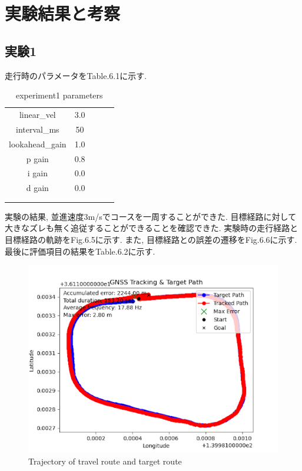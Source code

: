 \section{実験結果と考察}

\subsection{実験1}
走行時のパラメータをTable.6.1に示す.
\begin{table}[H]
     \centering
     \caption{experiment1 parameters}
     \begin{tabular}{cclll}
     \multicolumn{1}{c|}{linear\_vel}     & 3.0  &  &  &  \\
     \multicolumn{1}{c|}{interval\_ms}    & 50   &  &  &  \\
     \multicolumn{1}{c|}{lookahead\_gain} & 1.0  &  &  &  \\
     \multicolumn{1}{c|}{p gain}          & 0.8  &  &  &  \\
     \multicolumn{1}{c|}{i gain}          & 0.0  &  &  &  \\
     \multicolumn{1}{c|}{d gain}          & 0.0 &  &  &  \\
     \multicolumn{1}{l}{}                 &      &  &  &  \\
     \multicolumn{1}{l}{}                 &      &  &  & 
     \end{tabular}
\end{table}

実験の結果, 並進速度3m/sでコースを一周することができた.
目標経路に対して大きなズレも無く追従することができることを確認できた.
実験時の走行経路と目標経路の軌跡をFig.6.5に示す.
また, 目標経路との誤差の遷移をFig.6.6に示す.
最後に評価項目の結果をTable.6.2に示す.

\begin{figure}[H]
     \centering
    \includegraphics[keepaspectratio, scale=0.7]
         {images/3mspath.png}
    \caption{Trajectory of travel route and target route}
    \label{fig:path}
\end{figure}

